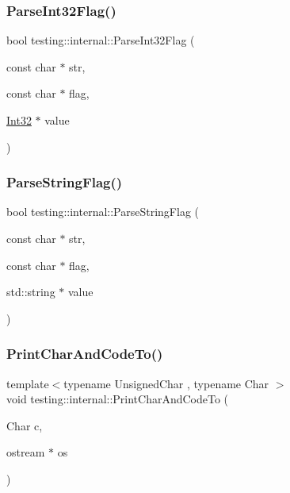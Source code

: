 \subsubsection{\texorpdfstring{Parse\+Int32\+Flag()}{ParseInt32Flag()}}
{\footnotesize\ttfamily bool testing\+::internal\+::\+Parse\+Int32\+Flag (\begin{DoxyParamCaption}\item[{const char $\ast$}]{str,  }\item[{const char $\ast$}]{flag,  }\item[{\hyperlink{namespacetesting_1_1internal_a8ee38faaf875f133358abaf9bc056cec}{Int32} $\ast$}]{value }\end{DoxyParamCaption})}

\mbox{\label{namespacetesting_1_1internal_aa4ce312efaaf7a97aac2303173afe021}} 
\subsubsection{\texorpdfstring{Parse\+String\+Flag()}{ParseStringFlag()}}
{\footnotesize\ttfamily bool testing\+::internal\+::\+Parse\+String\+Flag (\begin{DoxyParamCaption}\item[{const char $\ast$}]{str,  }\item[{const char $\ast$}]{flag,  }\item[{std\+::string $\ast$}]{value }\end{DoxyParamCaption})}

\mbox{\label{namespacetesting_1_1internal_a0c577e598e61d339ba45dd6643fb1969}} 
\subsubsection{\texorpdfstring{Print\+Char\+And\+Code\+To()}{PrintCharAndCodeTo()}}
{\footnotesize\ttfamily template$<$typename Unsigned\+Char , typename Char $>$ \\
void testing\+::internal\+::\+Print\+Char\+And\+Code\+To (\begin{DoxyParamCaption}\item[{Char}]{c,  }\item[{ostream $\ast$}]{os }\end{DoxyParamCaption})}

